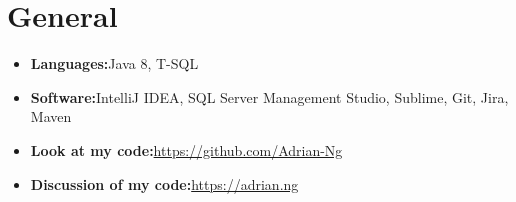 \documentclass[letterpaper,11pt]{article}
\newcommand{\resumeSubHeadingListStart}{\begin{itemize}[leftmargin=*]}
\newcommand{\resumeSubHeadingListEnd}{\end{itemize}}
\begin{document}
	
	
	\section{General}
	\resumeSubHeadingListStart
	\item{
		\textbf{Languages:}{\hfill Java 8, T-SQL}	
		\vspace{-5pt}	
	}

	\item{
		\textbf{Software:}{\hfill IntelliJ IDEA, SQL Server Management Studio, Sublime, Git, Jira, Maven}
		\vspace{-5pt}		
	}
	
	\item{
		\textbf{Look at my code:}{\hfill \href{https://github.com/Adrian-Ng}{https://github.com/Adrian-Ng}}
		\vspace{-5pt}	
	}

	\item{
		\textbf{Discussion of my code:}{\hfill \href{https://adrian.ng}{https://adrian.ng}}
		\vspace{-5pt}
	}
	
	\resumeSubHeadingListEnd
	
	
\end{document}
